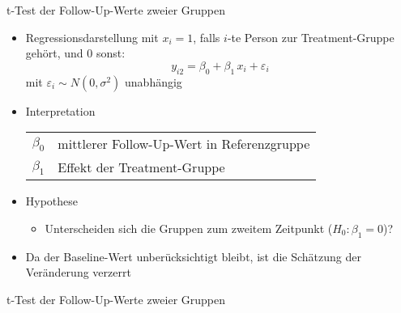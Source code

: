 \documentclass{beamer}
\begin{document}
\begin{frame}{t-Test der Follow-Up-Werte zweier Gruppen}
\begin{itemize}
  \item Regressionsdarstellung  mit $x_i = 1$, falls $i$-te Person zur Treatment-Gruppe gehört, und $0$ sonst:
    {\color{iwmorange}\[
      y_{i2} = \beta_0 + \beta_1 \, x_i + \varepsilon_i
    \]}
    mit $\varepsilon_i \sim N(0, \sigma^2)$ unabhängig
  \item Interpretation
    \begin{center}
    \begin{tabular}{ll}
    $\beta_0$ & mittlerer Follow-Up-Wert in Referenzgruppe\\
    $\beta_1$ & Effekt der Treatment-Gruppe
    \end{tabular}
    \end{center}
  \item Hypothese
    \begin{itemize}
        \item Unterscheiden sich die Gruppen zum zweitem Zeitpunkt ($H_0\colon \beta_1 = 0$)?
    \end{itemize}
  \item Da der Baseline-Wert unberücksichtigt bleibt, ist die Schätzung der Veränderung verzerrt
\end{itemize}
\end{frame}


\begin{frame}{t-Test der Follow-Up-Werte zweier Gruppen}
\begin{center}
\end{center}
\end{frame}
\end{document}

